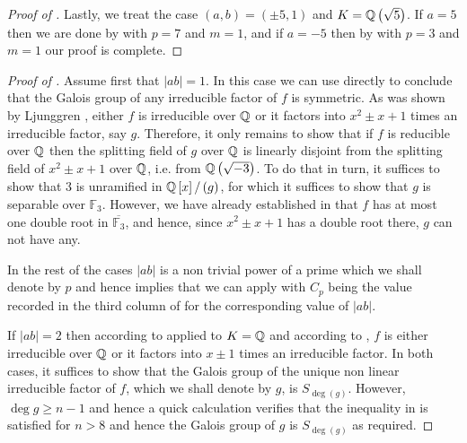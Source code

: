 \documentclass[../main.tex]{subfiles}
\begin{document}
\begin{proof}[Proof of ]
  Lastly, we treat the case $\left( a,b \right) = \left( \pm 5, 1 \right)$ and $K = \mathbb{Q}\left( \sqrt{5} \right)$. If $a = 5$ then we are done by  with $p = 7$ and $m = 1$, and if $a = -5$ then by  with $p = 3$ and $m = 1$ our proof is complete.
\end{proof}

\begin{proof}[Proof of ]
  Assume first that $\left| ab \right| = 1$.
  In this case we can use  directly to conclude that the Galois group of any irreducible factor of $f$ is symmetric.
  As was shown by Ljunggren \cite{Ljungren1960}, either $f$ is irreducible over $\mathbb{Q}$ or it factors into $x^2 \pm x + 1$ times an irreducible factor, say $g$.
  Therefore, it only remains to show that if $f$ is reducible over $\mathbb{Q}$ then the splitting field of $g$ over $\mathbb{Q}$ is linearly disjoint from the splitting field of $x^2 \pm x + 1$ over $\mathbb{Q}$, i.e. from $\mathbb{Q}\left( \sqrt{-3} \right)$.
  To do that in turn, it suffices to show that $3$ is unramified in $\mathbb{Q}\left[ x \right] / \left( g \right)$, for which it suffices to show that $g$ is separable over $\mathbb{F}_3$.
  However, we have already established in  that $f$ has at most one double root in $\overline{\mathbb{F}_3}$, and hence, since $x^2 \pm x + 1$ has a double root there, $g$ can not have any.

  In the rest of the cases $\left| ab \right|$ is a non trivial power of a prime which we shall denote by $p$ and hence  implies that we can apply  with $C_p$ being the value recorded in the third column of  for the corresponding value of $\left| ab \right|$.

  If $\left| ab \right| = 2$ then according to  applied to $K=\mathbb{Q}$ and according to , $f$ is either irreducible over $\mathbb{Q}$ or it factors into $x \pm 1$ times an irreducible factor.
  In both cases, it suffices to show that the Galois group of the unique non linear irreducible factor of $f$, which we shall denote by $g$, is $S_{\deg \left( g \right)}$.
  However, $\deg g \geq n - 1$ and hence a quick calculation verifies that the inequality in  is satisfied for $n > 8$ and hence the Galois group of $g$ is $S_{\deg \left( g \right)}$ as required.


\end{proof}
\end{document}
